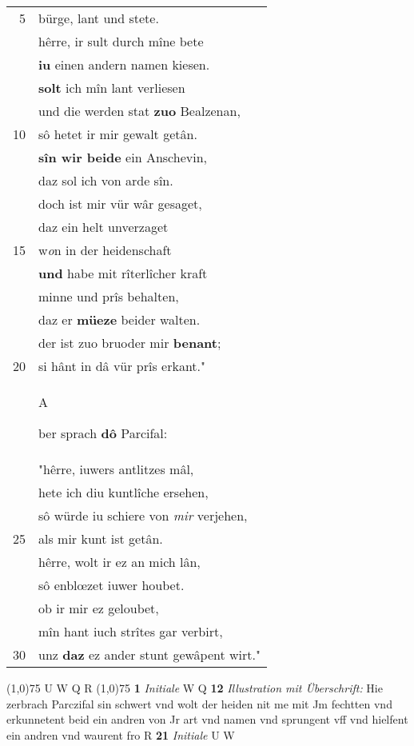 \documentclass[8pt,a4paper,notitlepage]{article}
\begin{document}
\begin{table}[ht]
\begin{minipage}[t]{0.5\linewidth}
\begin{tabular}{rl}
5 & bürge, lant und stete.\\ 
 & hêrre, ir sult durch mîne bete\\ 
 & \textbf{iu} einen andern namen kiesen.\\ 
 & \textbf{solt} ich mîn lant verliesen\\ 
 & und die werden stat \textbf{zuo} Bealzenan,\\ 
10 & sô hetet ir mir gewalt getân.\\ 
 & \textbf{sîn wir beide} ein Anschevin,\\ 
 & daz sol ich von arde sîn.\\ 
 & doch ist mir vür wâr gesaget,\\ 
 & daz ein helt unverzaget\\ 
15 & w\textit{o}n in der heidenschaft\\ 
 & \textbf{und} habe mit rîterlîcher kraft\\ 
 & minne und prîs behalten,\\ 
 & daz er \textbf{müeze} beider walten.\\ 
 & der ist zuo bruoder mir \textbf{benant};\\ 
20 & si hânt in dâ vür prîs erkant."\\ 
 & \begin{large}A\end{large}ber sprach \textbf{dô} Parcifal:\\ 
 & "hêrre, iuwers antlitzes mâl,\\ 
 & hete ich diu kuntlîche ersehen,\\ 
 & sô würde iu schiere von \textit{mir} verjehen,\\ 
25 & als mir kunt ist getân.\\ 
 & hêrre, wolt ir ez an mich lân,\\ 
 & sô enblœzet iuwer houbet.\\ 
 & ob ir mir ez geloubet,\\ 
 & mîn hant iuch strîtes gar verbirt,\\ 
30 & unz \textbf{daz} ez ander stunt gewâpent wirt."\\ 
\end{tabular}
\scriptsize
\line(1,0){75} \newline
U W Q R \newline
\line(1,0){75} \newline
\textbf{1} \textit{Initiale} W Q  \textbf{12} \textit{Illustration mit Überschrift:} Hie zerbrach Parczifal sin schwert vnd wolt der heiden nit me mit Jm fechtten vnd erkunnetent beid ein andren von Jr art vnd namen vnd sprungent vff vnd hielfent ein andren vnd waurent fro R  \textbf{21} \textit{Initiale} U W  \newline

\end{minipage}
\end{table}
\end{document}
